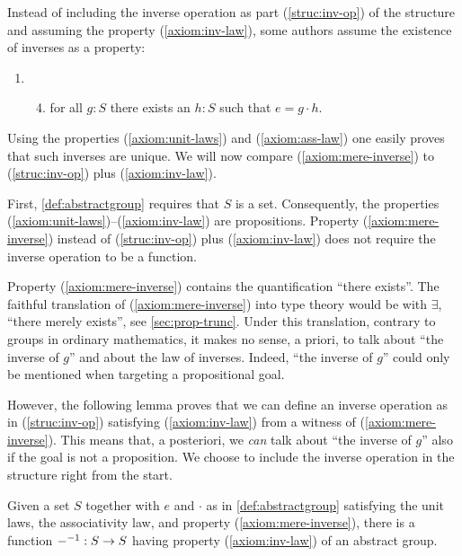 \begin{remark}\label{rem:inverses-as-property}
  \makeatletter %
  \renewcommand\p@enumii{}%
  \makeatother%
  Instead of including the inverse operation as part
  (\ref{struc:inv-op}) of the structure and assuming the property
  (\ref{axiom:inv-law}), some authors assume the existence of inverses
  as a property:
  \begin{enumerate}
  \item[]\begin{enumerate}\setcounter{enumii}{3}%
    \item\label{axiom:mere-inverse} for all $g:S$ there exists an
      $h:S$ such that $e = g \cdot h$.
    \end{enumerate}
  \end{enumerate}
  Using the properties (\ref{axiom:unit-laws}) and
  (\ref{axiom:ass-law}) one easily proves that such inverses are
  unique. We will now compare (\ref{axiom:mere-inverse}) to (\ref{struc:inv-op}) plus
  (\ref{axiom:inv-law}).

  First, \cref{def:abstractgroup} requires that $S$ is a set.
  Consequently, the properties
  (\ref{axiom:unit-laws})--(\ref{axiom:inv-law}) are propositions.
  Property (\ref{axiom:mere-inverse}) instead of (\ref{struc:inv-op}) plus
  (\ref{axiom:inv-law}) does not require the inverse operation to be a
  function.

  Property (\ref{axiom:mere-inverse}) contains the quantification
  ``there exists''.  The faithful translation of
  (\ref{axiom:mere-inverse}) into type theory would be with $\exists$,
  ``there merely exists'', see \cref{sec:prop-trunc}.  Under this
  translation, contrary to groups in ordinary mathematics, it makes no
  sense, a priori, to talk about ``the inverse of $g$'' and about the
  law of inverses.  Indeed, ``the inverse of $g$'' could only be
  mentioned when targeting a propositional goal.

  However, the following lemma proves that we can define an inverse
  operation as in (\ref{struc:inv-op}) satisfying
  (\ref{axiom:inv-law}) from a witness of (\ref{axiom:mere-inverse}).
  This means that, a posteriori, we \emph{can} talk about ``the
  inverse of $g$'' also if the goal is not a proposition.  We choose
  to include the inverse operation in the structure right from the
  start.
\end{remark} 

\begin{lemma}%
  \label{lem:group-inv-operation}%
  Given a set $S$ together with $e$ and $\cdot$ as in
  \cref{def:abstractgroup} satisfying the unit laws, the associativity
  law, and property (\ref{axiom:mere-inverse}), there is a function
  ${-}^{-1}: S \to S$ having property (\ref{axiom:inv-law}) of an
  abstract group.
\end{lemma}

